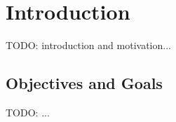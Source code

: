 \chapter{Introduction}

TODO: introduction and motivation...

\section*{Objectives and Goals}

TODO: ...
